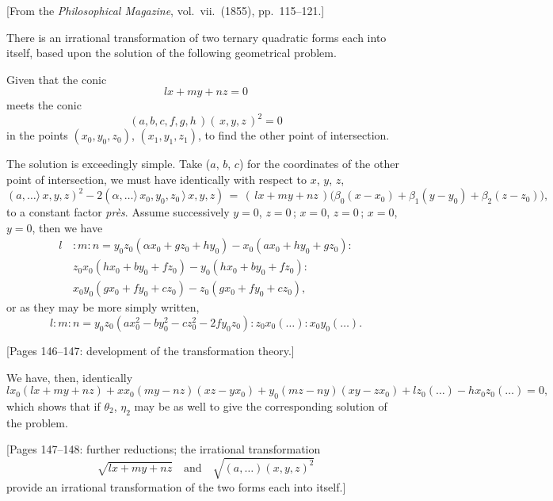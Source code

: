 \documentclass[11pt,a4paper]{article}
\theoremstyle{definition}
\begin{document}
[From the \textit{Philosophical Magazine}, vol.\ vii.\ (1855), pp.\ 115--121.]

\medskip

There is an irrational transformation of two ternary quadratic forms each into
itself, based upon the solution of the following geometrical problem.

\medskip

Given that the conic
\[
lx + my + nz = 0
\]
meets the conic
\[
(a, b, c, f, g, h\,)(\,x, y, z\,)^2 = 0
\]
in the points $(x_0, y_0, z_0)$, $(x_1, y_1, z_1)$, to find the other point of intersection.

\medskip

The solution is exceedingly simple. Take ($a$, $b$, $c$) for the coordinates of the
other point of intersection, we must have identically with respect to $x$, $y$, $z$,
\[
(a,\ldots\!\rangle\, x, y, z)^2 - 2(\alpha,\ldots\!\rangle\, x_0, y_0, z_0\,\rangle\, x, y, z)
\,=\, (\,lx + my + nz\,)\big(\beta_0(x-x_0) + \beta_1(y-y_0) + \beta_2(z-z_0)\big),
\]
to a constant factor \textit{pr\`es}. Assume successively $y=0$, $z=0$\,; $x=0$, $z=0$\,; $x=0$, $y=0$, then we have
\begin{align*}
l\,&:m:n = y_0 z_0(\alpha x_0 + g z_0 + h y_0) - x_0(a x_0 + h y_0 + g z_0): \\
& z_0 x_0 (h x_0 + b y_0 + f z_0) - y_0(h x_0 + b y_0 + f z_0): \\
& x_0 y_0 (g x_0 + f y_0 + c z_0) - z_0(g x_0 + f y_0 + c z_0),
\end{align*}
or as they may be more simply written,
\[
l: m: n = y_0 z_0 (a x_0^2 - b y_0^2 - c z_0^2 - 2f y_0 z_0): z_0 x_0(\ldots): x_0 y_0(\ldots).
\]

\medskip

[Pages 146--147: development of the transformation theory.]

\medskip

We have, then, identically
\[
l x_0 (lx + m y + nz) + x x_0 (m y - n z)(x z - y x_0)
+ y_0 (m z - n y)(x y - z x_0) + l z_0 (\ldots) - h x_0 z_0(\ldots) = 0,
\]
which shows that if $\theta_2$, $\eta_2$ may be as well to give the
corresponding solution of the problem.

\medskip

[Pages 147--148: further reductions; the irrational transformation
\[
\sqrt{l x + my + nz}\quad \text{and}\quad \sqrt{(a,\ldots)(x,y,z)^2}
\]
provide an irrational transformation of the two forms each into itself.]

\medskip
\end{document}
